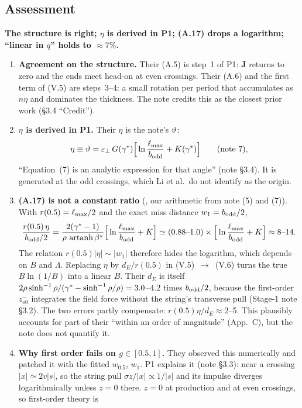 \documentclass[11pt]{article}
\newcommand{\vhead}[1]{\noindent\textbf{\textsf{#1}}\par\smallskip}
\begin{document}
\subsection{Assessment}
\begin{verdict}
\vhead{The structure is right; $\eta$ is derived in P1; (A.17) drops a logarithm; ``linear in $q$'' holds to $\approx7\%$.}
\begin{enumerate}[leftmargin=*]
\item \textbf{Agreement on the structure.} Their (A.5) is step~1 of P1: $\mathbf J$ returns to zero and the ends meet
  head-on at even crossings. Their (A.6) and the first term of (V.5) are steps~3--4: a small rotation per period that
  accumulates as $n\eta$ and dominates the thickness. The note credits this as the closest prior work (\S3.4 ``Credit'').
\item \textbf{$\eta$ is derived in P1.} Their $\eta$ is the note's $\vartheta$:
  \[
    \eta\equiv\vartheta=\varepsilon_\perp\,G(\gamma^*)\Big[\ln\frac{\ell_{\max}}{b_{\rm odd}}+K(\gamma^*)\Big]\qquad\text{(note 7)},
  \]
  ``Equation~(7) is an analytic expression for that angle'' (note \S3.4). It is generated at the odd crossings, which Li et al.\
  do not identify as the origin.
\item \textbf{(A.17) is not a constant ratio} (\EST{}, our arithmetic from note (5) and (7)). With $r(0.5)=\ell_{\max}/2$ and
  the exact miss distance $w_1=b_{\rm odd}/2$,
  \[
    \frac{r(0.5)\,\eta}{b_{\rm odd}/2}=\frac{2(\gamma^*-1)}{\rho\,\operatorname{artanh}\beta^*}\Big[\ln\frac{\ell_{\max}}{b_{\rm odd}}+K\Big]
    \simeq(0.88\text{--}1.0)\times\Big[\ln\frac{\ell_{\max}}{b_{\rm odd}}+K\Big]\approx8\text{--}14 .
  \]
  The relation $r(0.5)|\eta|\sim|w_1|$ therefore hides the logarithm, which depends on $B$ and $\Lambda$. Replacing $\eta$
  by $d_E/r(0.5)$ in (V.5)~$\to$~(V.6) turns the true $B\ln(1/B)$ into a linear $B$. Their $d_E$ is itself
  $2\rho\sinh^{-1}\rho/(\gamma^*-\sinh^{-1}\rho/\rho)=3.0$--$4.2$ times $b_{\rm odd}/2$, because the first-order $z^-_{o0}$ integrates
  the field force without the string's transverse pull (Stage-1 note \S3.2). The two errors partly compensate: $r(0.5)\eta/d_E\approx2$--5.
  This plausibly accounts for part of their ``within an order of magnitude'' (App.~C), but the note does not quantify it.
\item \textbf{Why first order fails on $g\in[0.5,1]$.} They observed this numerically and patched it with the fitted $w_{0.5}$,
  $w_1$. P1 explains it (note \S3.3): near a crossing $|x|\simeq2v|s|$, so the string pull $\sigma z/|x|\propto1/|s|$ and its
  impulse diverges logarithmically unless $z=0$ there. $z=0$ at production and at even crossings, so first-order theory is

\end{enumerate}
\end{verdict}
\end{document}
